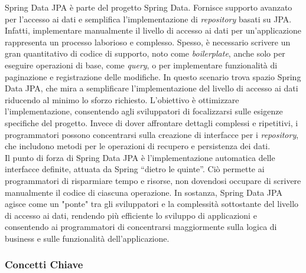 Spring Data JPA è parte del progetto Spring Data. Fornisce supporto avanzato per l'accesso ai dati e semplifica l'implementazione di \textit{repository} basati su JPA.\\
Infatti, implementare manualmente il livello di accesso ai dati per un'applicazione rappresenta un processo laborioso e complesso. Spesso, è necessario scrivere un gran quantitativo di codice di supporto, noto come \textit{boilerplate}, anche solo per eseguire operazioni di base, come \textit{query}, o per implementare funzionalità di paginazione e registrazione delle modifiche. In questo scenario trova spazio Spring Data JPA, che mira a semplificare l'implementazione del livello di accesso ai dati riducendo al minimo lo sforzo richiesto. L'obiettivo è ottimizzare l’implementazione, consentendo agli sviluppatori di focalizzarsi sulle esigenze specifiche del progetto. Invece di dover affrontare dettagli complessi e ripetitivi, i programmatori possono concentrarsi sulla creazione di interfacce per i \textit{repository}, che includono metodi per le operazioni di recupero e persistenza dei dati.\cite{SPRINGDATA_spring2}\\
Il punto di forza di Spring Data JPA è l’implementazione automatica delle interfacce definite, attuata da Spring “dietro le quinte”.\cite{SPRINGDATA_baeldung} Ciò permette ai programmatori di risparmiare tempo e risorse, non dovendosi occupare di scrivere manualmente il codice di ciascuna operazione.
In sostanza, Spring Data JPA agisce come un "ponte" tra gli sviluppatori e la complessità sottostante del livello di accesso ai dati, rendendo più efficiente lo sviluppo di applicazioni e consentendo ai programmatori di concentrarsi maggiormente sulla logica di business e sulle funzionalità dell'applicazione.

\subsubsection{Concetti Chiave}

